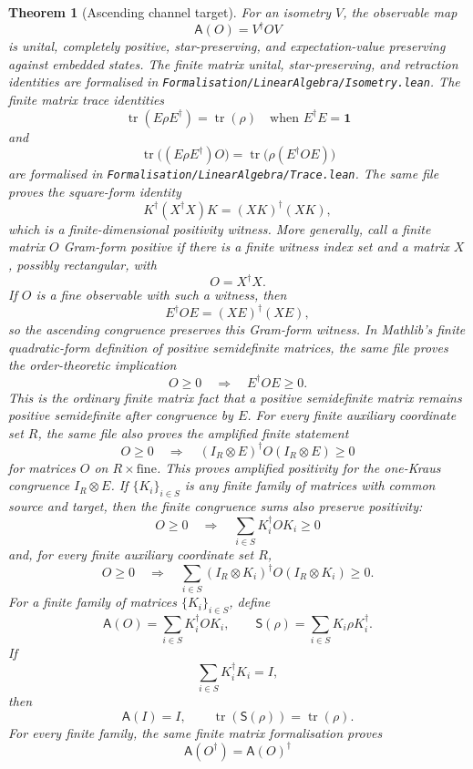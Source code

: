 \documentclass[11pt]{article}
\newtheorem{theorem}[definition]{Theorem}
\begin{document}
\begin{theorem}[Ascending channel target]
For an isometry \(V\), the observable map
\[
\mathsf A(O)=V^\dagger O V
\]
is unital, completely positive, star-preserving, and expectation-value
preserving against embedded states. The finite matrix unital, star-preserving,
and retraction identities are formalised in
\texttt{Formalisation/LinearAlgebra/Isometry.lean}. The finite matrix trace
identities
\[
\operatorname{tr}(E\rho E^\dagger)=\operatorname{tr}(\rho)
\quad\text{when }E^\dagger E=\mathbf 1
\]
and
\[
\operatorname{tr}\bigl((E\rho E^\dagger)O\bigr)
=\operatorname{tr}\bigl(\rho(E^\dagger O E)\bigr)
\]
are formalised in \texttt{Formalisation/LinearAlgebra/Trace.lean}. The same
file proves the square-form identity
\[
K^\dagger(X^\dagger X)K=(XK)^\dagger(XK),
\]
which is a finite-dimensional positivity witness. More generally, call a
finite matrix \(O\) Gram-form positive if there is a finite witness index set
and a matrix \(X\), possibly rectangular, with
\[
O=X^\dagger X.
\]
If \(O\) is a fine observable with such a witness, then
\[
E^\dagger O E=(XE)^\dagger(XE),
\]
so the ascending congruence preserves this Gram-form witness. In Mathlib's
finite quadratic-form definition of positive semidefinite matrices, the same
file proves the order-theoretic implication
\[
O\geq 0\quad\Longrightarrow\quad E^\dagger O E\geq 0.
\]
This is the ordinary finite matrix fact that a positive semidefinite matrix
remains positive semidefinite after congruence by \(E\). For every finite
auxiliary coordinate set \(R\), the same file also proves the amplified
finite statement
\[
O\geq 0\quad\Longrightarrow\quad
(I_R\otimes E)^\dagger O(I_R\otimes E)\geq 0
\]
for matrices \(O\) on \(R\times\text{fine}\). This proves amplified
positivity for the one-Kraus congruence \(I_R\otimes E\). If
\(\{K_i\}_{i\in S}\) is any finite family of matrices with common source and
target, then the finite congruence sums also preserve positivity:
\[
O\geq 0\quad\Longrightarrow\quad
\sum_{i\in S}K_i^\dagger O K_i\geq 0
\]
and, for every finite auxiliary coordinate set \(R\),
\[
O\geq 0\quad\Longrightarrow\quad
\sum_{i\in S}(I_R\otimes K_i)^\dagger O(I_R\otimes K_i)\geq 0.
\]
For a finite family of matrices \(\{K_i\}_{i\in S}\), define
\[
\mathsf A(O)=\sum_{i\in S}K_i^\dagger O K_i,\qquad
\mathsf S(\rho)=\sum_{i\in S}K_i\rho K_i^\dagger.
\]
If
\[
\sum_{i\in S}K_i^\dagger K_i=I,
\]
then
\[
\mathsf A(I)=I,\qquad
\operatorname{tr}(\mathsf S(\rho))=\operatorname{tr}(\rho).
\]
For every finite family, the same finite matrix formalisation proves
\[
\mathsf A(O^\dagger)=\mathsf A(O)^\dagger
\]
\end{theorem}
\end{document}

